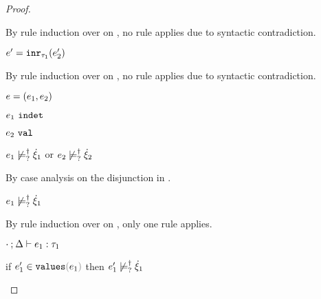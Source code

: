 \begin{proof}
\begin{byCases}
\begin{byCases}
\begin{byCases}
\begin{byCases}
\begin{byCases}
\begin{pfsteps*}
            \end{pfsteps*}
            By rule induction over  on , no rule applies due to syntactic contradiction.
            \item[\text{(\ref{rule:VInr})}] 
            \begin{pfsteps*} 
            \item $e'=\mathtt{inr}_{\tau_1}({e_2'})$ 
            \end{pfsteps*}
            By rule induction over  on , no rule applies due to syntactic contradiction.
          \end{byCases}
        \end{byCases}
      \end{byCases}
      \item[\text{(\ref{rule:IPairL})}] 
      \begin{pfsteps*}
      \item $e=(e_1 , e_2)$ 
      \item $e_1 ~\mathtt{indet}$  
      \item $e_2 ~\mathtt{val}$  
      \item $e_1 \not\models_{?}^{\dag} \dot{\xi}_1$ or $e_2 \not\models_{?}^{\dag} \dot{\xi}_2$  
      \end{pfsteps*}
      By case analysis on the disjunction in .
      \begin{byCases}
        \item[\cnotsatisfyormay{e_1}{\hxi_1}]
        \begin{pfsteps*}
        \item $e_1 \not\models_{?}^{\dag} \dot{\xi}_1$  
        \end{pfsteps*}
        By rule induction over  on , only one rule applies.
        \begin{byCases}
          \item[\text{(\ref{rule:TPair})}]
          \begin{pfsteps*}
          \item $\cdot \mathbin{;} \Delta \vdash e_1 : \tau_1$  
          \item if $\inValues{e_1'}{e_1}$ then $e_1' \not\models_{?}^{\dag} \dot{\xi}_1$  

\end{pfsteps*}
\end{byCases}
\end{byCases}
\end{byCases}
\end{byCases}
\end{proof}
